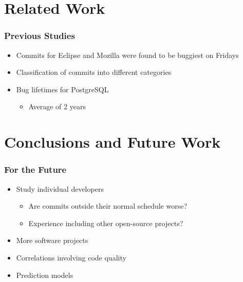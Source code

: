 \documentclass[aspectratio=43]{beamer}
\begin{document}
\section{Related Work}
\begin{frame}
  \frametitle{Previous Studies}

  \begin{itemize}
    \item Commits for Eclipse and Mozilla were found to be buggiest on Fridays \cite[MSR]{sliwerski-msr-2005}

    \item Classification of commits into different categories \cite[MSR]{largeCommits}

    \item Bug lifetimes for PostgreSQL \cite[MSR]{2006-long}

    \begin{itemize}
      \item Average of 2 years
    \end{itemize}
  \end{itemize}
\end{frame}

\section{Conclusions and Future Work}
\begin{frame}
  \frametitle{For the Future}

  \begin{itemize}
    \item Study individual developers
   
    \begin{itemize}
      \item Are commits outside their normal schedule worse?

      \item Experience including other open-source projects?
    \end{itemize}

    \item More software projects

    \item Correlations involving code quality

    \item Prediction models
  \end{itemize}

\end{frame}
\end{document}
